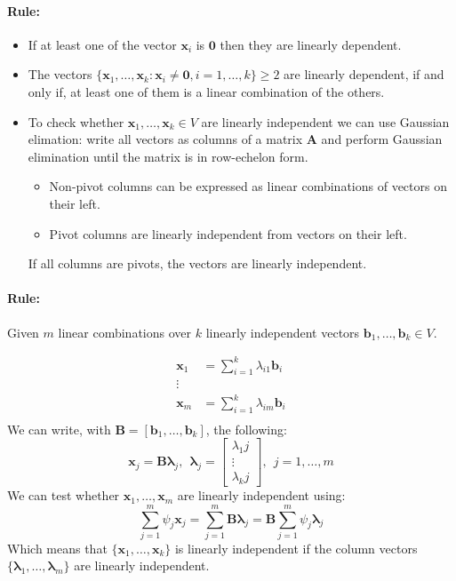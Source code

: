 \documentclass[12pt]{article}
\newcommand{\bx}{{\bm{x}}}
\newcommand{\A}{{\bm{A}}}
\newcommand{\B}{{\bm{B}}}
\newcommand{\vecs}[2]{{\bm{#1}_1, \dots, \bm{#1}_#2}}
\newcommand{\xrule}[1]{\paragraph{\colorbox{#1!30}{\textbf{Rule:}}}}
\begin{document}
\xrule{red}
%
\begin{itemize}
  \item If at least one of the vector $\bm{x}_i$ is $\bm{0}$ then they are linearly dependent.
  \item The vectors $\{\bx_1, \dots, \bx_k : \bx_i \neq \bm0, i =1, \dots, k\} \geqslant 2$ are linearly dependent, if and only if, at least one of them is a linear combination of the others.
  \item To check whether $\bx_1, \dots, \bx_k \in V$ are linearly independent we can use Gaussian elimation: write all vectors as columns of a matrix $\A$ and perform Gaussian elimination until the matrix is in row-echelon form.\begin{itemize}
  \item Non-pivot columns can be expressed as linear combinations of vectors on their left.
  \item Pivot columns are linearly independent from vectors on their left.
	  \end{itemize}
	  If all columns are pivots, the vectors are linearly independent.
\end{itemize}

\xrule{red} Given $m$ linear combinations over $k$ linearly independent vectors $\bm{b}_1, \dots, \bm{b}_k \in V$.

\begin{equation}
	\begin{aligned}
		\bx_1 &= \sum\limits_{i=1}^k \lambda_{i1} \bm{b}_i \\
		\vdots & \\
		\bx_m &= \sum\limits_{i=1}^k \lambda_{im} \bm{b}_i \\
	\end{aligned}
\end{equation}
%
We can write, with $\B = [\bm{b}_1, \dots, \bm{b}_k]$, the following:
%
\begin{equation}
	\bx_j = \bm{B} \bm{\lambda}_j, \ \ \bm{\lambda}_j = \begin{bmatrix}
		\lambda_1j \\
		\vdots \\
		\lambda_kj
	\end{bmatrix}, \ \ j = 1, \dots,m 
\end{equation}
%
We can test whether $\bx_1, \dots, \bx_m$ are linearly independent using:
\begin{equation}
	\sum\limits_{j=1}^m \psi_j \bx_j = \sum\limits_{j=1}^m \B\bm{\lambda}_j = \B \sum\limits_{j=1}^m \psi_j \bm{\lambda}_j
\end{equation}
%
Which means that $\{\vecs{x}{k}\}$ is linearly independent if the column vectors $\{\vecs{\lambda}{m}\}$ are linearly independent.
\end{document}
